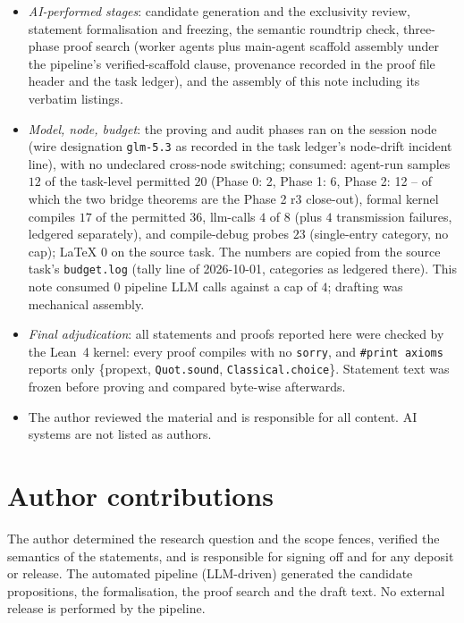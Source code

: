 \documentclass[11pt]{article}
\begin{document}
\begin{itemize}
\item \emph{AI-performed stages}: candidate generation and the exclusivity
review, statement formalisation and freezing, the semantic roundtrip check,
three-phase proof search (worker agents plus main-agent scaffold assembly
under the pipeline's verified-scaffold clause, provenance recorded in the
proof file header and the task ledger), and the assembly of this note
including its verbatim listings.
\item \emph{Model, node, budget}: the proving and audit phases ran on the
session node (wire designation \texttt{glm-5.3} as recorded in the task
ledger's node-drift incident line), with no undeclared cross-node switching;
consumed: agent-run samples $12$ of the task-level permitted $20$ (Phase 0: 2,
Phase 1: 6, Phase 2: 12 -- of which the two bridge theorems are the Phase 2
r3 close-out), formal kernel compiles $17$ of the permitted $36$,
llm-calls $4$ of $8$ (plus $4$ transmission failures, ledgered separately),
and compile-debug probes $23$ (single-entry category, no cap); LaTeX $0$ on
the source task. The numbers are copied from the source task's
\texttt{budget.log} (tally line of 2026-10-01, categories as ledgered there).
This note consumed $0$ pipeline LLM calls against a cap of $4$; drafting was
mechanical assembly.
\item \emph{Final adjudication}: all statements and proofs reported here were
checked by the Lean~4 kernel: every proof compiles with no \texttt{sorry}, and
\texttt{\#print axioms} reports only \{propext, \texttt{Quot.sound},
\texttt{Classical.choice}\}. Statement text was frozen before proving and
compared byte-wise afterwards.
\item The author reviewed the material and is responsible for all content. AI
systems are not listed as authors.
\end{itemize}

\section*{Author contributions}
The author determined the research question and the scope fences, verified
the semantics of the statements, and is responsible for signing off and for
any deposit or release. The automated pipeline (LLM-driven) generated the
candidate propositions, the formalisation, the proof search and the draft
text. No external release is performed by the pipeline.
\end{document}
